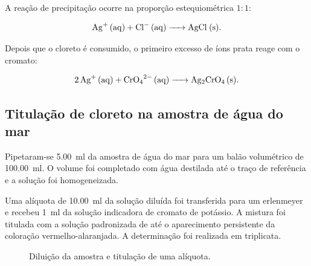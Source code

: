 \documentclass[a4paper,12pt]{article}
\begin{document}
A reação de precipitação ocorre na proporção estequiométrica $1:1$:

\begin{equation}
  \ce{Ag+ (aq) + Cl- (aq) -> AgCl (s)}.
  \label{eq:precipitacao_agcl}
\end{equation}

Depois que o cloreto é consumido, o primeiro excesso de íons prata reage
com o cromato:

\begin{equation}
  \ce{2 Ag+ (aq) + CrO4^2- (aq) -> Ag2CrO4 (s)}.
  \label{eq:indicador_cromato}
\end{equation}

\subsection{Titulação de cloreto na amostra de água do mar}

Pipetaram-se \qty{5.00}{\milli\litre} da amostra de água do mar para um
balão volumétrico de \qty{100.00}{\milli\litre}. O volume foi completado
com água destilada até o traço de referência e a solução foi
homogeneizada.

Uma alíquota de \qty{10.00}{\milli\litre} da solução diluída foi
transferida para um erlenmeyer e recebeu \qty{1}{\milli\litre} da solução
indicadora de cromato de potássio. A mistura foi titulada com a solução
padronizada de  até o aparecimento persistente da coloração
vermelho-alaranjada. A determinação foi realizada em triplicata.

\begin{figure}[H]
\centering
{}
\caption{Diluição da amostra e titulação de uma alíquota.}
\label{fig:titulacao_amostra}
\end{figure}
\end{document}
